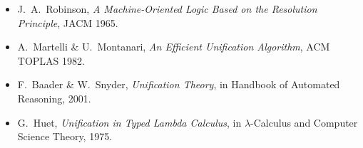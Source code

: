 \documentclass[11pt, a4paper]{article}
\begin{document}
\vspace{1em}
\begin{tcolorbox}[colback=codegray, colframe=rulecolor, title=\textbf{Further Reading}]
\begin{itemize}[leftmargin=*, itemsep=3pt, topsep=0pt]
    \item J.~A.~Robinson, \emph{A Machine-Oriented Logic Based on the Resolution Principle}, JACM 1965.
    \item A.~Martelli \& U.~Montanari, \emph{An Efficient Unification Algorithm}, ACM TOPLAS 1982.
    \item F.~Baader \& W.~Snyder, \emph{Unification Theory}, in Handbook of Automated Reasoning, 2001.
    \item G.~Huet, \emph{Unification in Typed Lambda Calculus}, in $\lambda$-Calculus and Computer Science Theory, 1975.
\end{itemize}
\end{tcolorbox}
 
\end{document}
